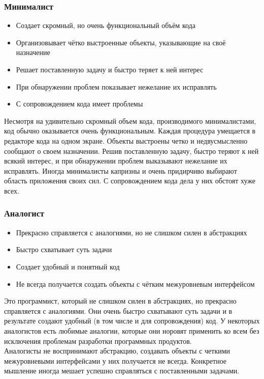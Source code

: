 \documentclass{../industrial-development}
\begin{document}
\begin{frame} \frametitle{Минималист}
	\begin{itemize}
		\item Создает скромный, но очень функциональный объём кода
		\item Организовывает чётко выстроенные объекты, указывающие на своё назначение
		\item Решает поставленную задачу и быстро теряет к ней интерес
		\item При обнаружении проблем показывает нежелание их исправлять
		\item  С сопровождением кода имеет проблемы
	\end{itemize}
\end{frame}
\lecturenotes
	 Несмотря на удивительно скромный объем кода, производимого минималистами, код обычно оказывается очень функциональным. Каждая процедура умещается в редакторе кода на одном экране. Объекты выстроены четко и недвусмысленно сообщают о своем назначении. 
	Решив поставленную задачу, быстро теряют к ней всякий интерес, и при обнаружении проблем выказывают нежелание их исправлять. Иногда минималисты капризны и очень придирчиво выбирают область приложения своих сил. С сопровождением кода дела у них обстоят хуже всех.

\begin{frame} \frametitle{Аналогист}
	\begin{itemize}
		\item Прекрасно справляется с аналогиями, но не слишком силен в абстракциях
		\item Быстро схватывает суть задачи
		\item Создает удобный и понятный код
		\item Не всегда получается создать объекты с чётким межуровневым интерфейсом
	\end{itemize}
\end{frame}
\lecturenotes
 Это программист, который не слишком силен в абстракциях, но прекрасно справляется с аналогиями. Они очень быстро схватывают суть задачи и в результате создают удобный (в том числе и для сопровождения) код. У некоторых аналогистов есть любимые аналогии, которые они норовят применить ко всем без исключения проблемам разработки программных продуктов.  \\ 
	Аналогисты не воспринимают абстракцию, создавать объекты с четкими межуровневыми интерфейсами у них получается не всегда. Конкретное мышление иногда мешает успешно справляться с поставленными задачами.
\end{document}
